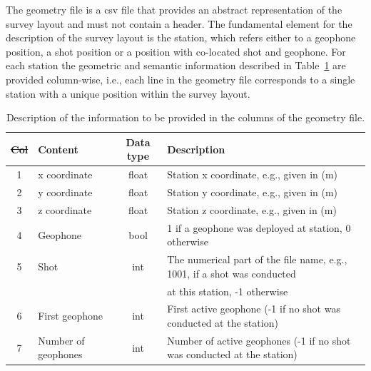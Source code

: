 \documentclass[a4paper,fleqn]{cas-sc}
\providecommand{\DIFadd}[1]{{\protect\color{blue}\uwave{#1}}} %
\providecommand{\DIFdel}[1]{{\protect\color{red}\sout{#1}}}                      %
\providecommand{\DIFdelend}{} %
\providecommand{\DIFaddFL}[1]{\DIFadd{#1}} %
\providecommand{\DIFdelFL}[1]{\DIFdel{#1}} %
\providecommand{\DIFaddbeginFL}{} %
\providecommand{\DIFaddendFL}{} %
\providecommand{\DIFdelbeginFL}{} %
\providecommand{\DIFdelendFL}{} %
\newcommand{\DIFscaledelfig}{0.5}
\newlength{\DIFdelgraphicswidth} %
\newlength{\DIFdelgraphicsheight} %
\newcommand{\DIFaddincludegraphics}[2][]{{\color{blue}\fbox{\DIFOincludegraphics[#1]{#2}}}} %
\newcommand{\DIFdelincludegraphics}[2][]{%
\sbox{\DIFdelgraphicsbox}{\DIFOincludegraphics[#1]{#2}}%
\settoboxwidth{\DIFdelgraphicswidth}{\DIFdelgraphicsbox} %
\settoboxtotalheight{\DIFdelgraphicsheight}{\DIFdelgraphicsbox} %
\scalebox{\DIFscaledelfig}{%
\parbox[b]{\DIFdelgraphicswidth}{\usebox{\DIFdelgraphicsbox}\\[-\baselineskip] \rule{\DIFdelgraphicswidth}{0em}}\llap{\resizebox{\DIFdelgraphicswidth}{\DIFdelgraphicsheight}{%
\setlength{\unitlength}{\DIFdelgraphicswidth}%
\begin{picture}(1,1)%
\thicklines\linethickness{2pt} %
{\color[rgb]{1,0,0}\put(0,0){\framebox(1,1){}}}%
{\color[rgb]{1,0,0}\put(0,0){\line( 1,1){1}}}%
{\color[rgb]{1,0,0}\put(0,1){\line(1,-1){1}}}%
\end{picture}%
}\hspace*{3pt}}} %
} %
\DeclareRobustCommand{\DIFdelend}{\DIFOaddend \let\includegraphics\DIFOincludegraphics} %
\DeclareRobustCommand{\DIFaddbeginFL}{\DIFOaddbeginFL \let\includegraphics\DIFaddincludegraphics} %
\DeclareRobustCommand{\DIFaddendFL}{\DIFOaddendFL \let\includegraphics\DIFOincludegraphics} %
\DeclareRobustCommand{\DIFdelbeginFL}{\DIFOdelbeginFL \let\includegraphics\DIFdelincludegraphics} %
\DeclareRobustCommand{\DIFdelendFL}{\DIFOaddendFL \let\includegraphics\DIFOincludegraphics} %
\begin{document}
\DIFdelend The geometry file is a csv file that provides an abstract representation of the survey layout and must not contain a header. The fundamental element for the description of the survey layout is the station, which refers either to a geophone position, a shot position or a position with co-located shot and geophone. For each station the geometric and semantic information described in Table~\ref{tab:geometry} are provided column-wise, i.e., each line in the geometry file corresponds to a single station with a unique position within the survey layout. 
\begin{table}
[pos=h]
    \caption{Description of the information to be provided in the columns of the geometry file.}
    \centering
    \begin{tabular}{clcl}
        \toprule
        \DIFdelbeginFL \DIFdelFL{Col }\DIFdelendFL \DIFaddbeginFL \textbf{\DIFaddFL{Col}} \DIFaddendFL & \textbf{Content} & \textbf{Data type} & \textbf{Description} \\
        \midrule
        1 & x coordinate & float & Station x coordinate, e.g., given in (m) \\ 
        2 & y coordinate & float & Station y coordinate, e.g., given in (m) \\ 
        3 & z coordinate & float & Station z coordinate, e.g., given in (m) \\ 
        4 & Geophone & bool & 1 if a geophone was deployed at station, 0 otherwise \\ 
        5 & Shot & int & The numerical part of the file name, e.g., 1001, if a shot was conducted \\
          & & & at this station, -1 otherwise \\ 
        6 & First geophone & int & First active geophone (-1 if no shot was conducted at the station) \\ 
        7 & Number of geophones & int & Number of active geophones (-1 if no shot was conducted at the station) \\
        \bottomrule
    \end{tabular}
    \label{tab:geometry}
\end{table}
\end{document}
